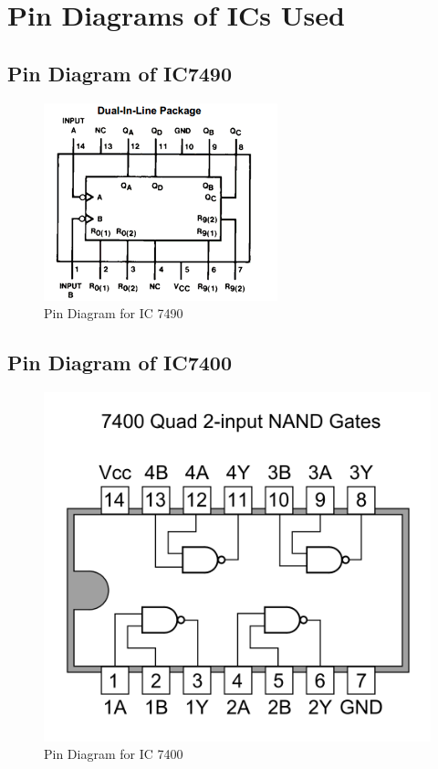 \documentclass[11pt]{article}
\begin{document}
\section{Pin Diagrams of ICs Used}

\subsection{Pin Diagram of IC7490}
\begin{figure}[H]
	\centering
	\includegraphics[scale = 1.5]{7490.png}
	\caption{Pin Diagram for IC 7490}
\end{figure}
\subsection{Pin Diagram of IC7400}
\begin{figure}[H]
	\centering
	\includegraphics[scale = 0.25]{7400.png}
	\caption{Pin Diagram for IC 7400}
\end{figure}
\end{document}

